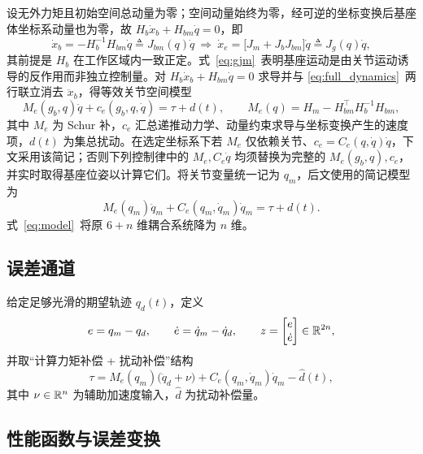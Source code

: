 设无外力矩且初始空间总动量为零；空间动量始终为零，经可逆的坐标变换后基座体坐标系动量也为零，故 \(H_b\dot x_b+H_{bm}\dot q=0\)，即
\begin{equation}
\dot x_b=-H_b^{-1}H_{bm}\dot q\triangleq J_{bm}(q)\dot q
\ \Longrightarrow\
\dot x_e=\bigl[J_m+J_bJ_{bm}\bigr]\dot q\triangleq J_g(q)\dot q ,
\label{eq:gjm}
\end{equation}
其前提是 \(H_b\) 在工作区域内一致正定。式~\eqref{eq:gjm}~表明基座运动是由关节运动诱导的反作用而非独立控制量。对 \(H_b\dot x_b+H_{bm}\dot q=0\) 求导并与 \eqref{eq:full_dynamics}~两行联立消去 \(\ddot x_b\)，得等效关节空间模型
\begin{equation}
M_e(g_b,q)\ddot q+c_e(g_b,q,\dot q)=\tau+d(t),\qquad
M_e(q)=H_m-H_{bm}^{\top}H_b^{-1}H_{bm},
\label{eq:ejm}
\end{equation}
其中 \(M_e\) 为 Schur 补，\(c_e\) 汇总递推动力学、动量约束求导与坐标变换产生的速度项，\(d(t)\) 为集总扰动。在选定坐标系下若 \(M_e\) 仅依赖关节、\(c_e=C_e(q,\dot q)\dot q\)，下文采用该简记；否则下列控制律中的 \(M_e,C_e\dot q\) 均须替换为完整的 \(M_e(g_b,q),c_e\)，并实时取得基座位姿以计算它们。将关节变量统一记为 \(q_m\)，后文使用的简记模型为
\begin{equation}
M_e(q_m)\ddot q_m+C_e(q_m,\dot q_m)\dot q_m=\tau+d(t).
\label{eq:model}
\end{equation}
式~\eqref{eq:model}~将原 \(6+n\) 维耦合系统降为 \(n\) 维。

\subsection{误差通道}
\label{sec:error_channel}

给定足够光滑的期望轨迹 \(q_d(t)\)，定义
\begin{equation}
e=q_m-q_d,\qquad \dot e=\dot q_m-\dot q_d,\qquad
z=\begin{bmatrix}e\\ \dot e\end{bmatrix}\in\mathbb R^{2n},
\label{eq:error_state}
\end{equation}
并取“计算力矩补偿 + 扰动补偿”结构
\begin{equation}
\tau=M_e(q_m)\bigl(\ddot q_d+\nu\bigr)+C_e(q_m,\dot q_m)\dot q_m-\hat d(t),
\label{eq:computed_torque}
\end{equation}
其中 \(\nu\in\mathbb R^{n}\) 为辅助加速度输入，\(\hat d\) 为扰动补偿量。


\subsection{性能函数与误差变换}
\label{sec:performance}

